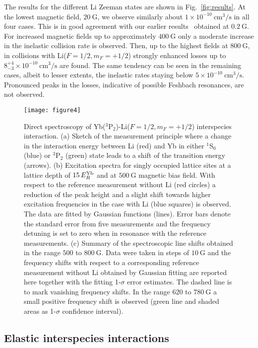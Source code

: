 \documentclass[twocolumn,superscriptaddress,showpacs,floatfix,amsmath,amssymb]{revtex4-1}
\newcommand{\singlet}{{}^1\mathrm{S}_0}
\newcommand{\triplet}{{}^3\mathrm{P}_2}
\newcommand{\cm}{\mathrm{cm}}
\newcommand{\s}{\mathrm{s}}
\newcommand{\G}{\mathrm{G}}
\begin{document}
The results for the different Li Zeeman states are shown in
Fig.~\ref{fig:results}. At the lowest magnetic field, $20~\G$, we observe
similarly about $1 \times 10^{-10}~\cm^3/\s$ in all four cases. This is in
good agreement with our earlier results~\cite{schafer_spin_2017} obtained at
$0.2~\G$. For increased magnetic fields up to approximately $400~\G$ only a
moderate increase in the inelastic collision rate is observed. Then, up to the
highest fields at $800~\G$, in collisions with Li($F=1/2, m_F=+1/2$) strongly
enhanced losses up to $8^{+4}_{-3} \times 10^{-10}~\cm^3/\s$ are found. The
same tendency can be seen in the remaining cases, albeit to lesser extents,
the inelastic rates staying below $5 \times 10^{-10}~\cm^3/\s$. Pronounced
peaks in the losses, indicative of possible Feshbach resonances, are not
observed.
\begin{figure}[H]
	\centering
	\texttt{[image: figure4]}
	\caption{
		Direct spectroscopy of Yb($\triplet$)-Li($F=1/2, m_F=+1/2$) interspecies
		interaction. 
		(a) Sketch of the measurement principle where a change in the interaction
		energy between Li (red) and Yb in either $\singlet$ (blue) or $\triplet$
		(green) state leads to a shift of the transition energy (arrows).
		(b) Excitation spectra for singly occupied lattice sites at a
		lattice depth of $15\,E_R^{\rm Yb}$ and at $500~\G$ magnetic bias field.
		With respect to the reference measurement without Li (red circles) a
		reduction of the peak height and a slight shift towards higher excitation
		frequencies in the case with Li (blue squares) is observed. The data are
		fitted by Gaussian functions (lines). Error bars denote the standard error
		from five measurements and the frequency detuning is set to zero when in
		resonance with the reference measurements.
		(c) Summary of the spectroscopic line shifts obtained in the
		range $500$ to $800~\G$. Data were taken in steps of $10~\G$ and the
		frequency shifts with respect to a corresponding reference measurement
		without Li obtained by Gaussian fitting are reported here together with
		the fitting 1-$\sigma$ error estimates. The dashed line is to mark
		vanishing frequency shifts. In the range $620$ to $780~\G$ a small
		positive frequency shift is observed (green line and shaded areas as
		1-$\sigma$ confidence interval).
	}
	\label{fig:spectroscopy}
\end{figure}

\subsection{Elastic interspecies interactions}
\label{sec:el}
\end{document}
